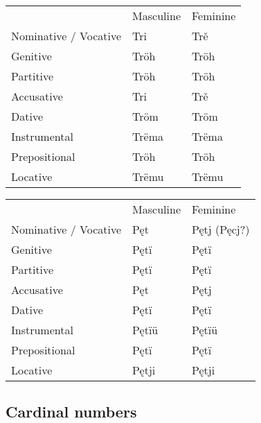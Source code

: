 \begin{table}
	\begin{tabular}{lll}
		& Masculine & Feminine \\
		Nominative / Vocative & Tri & Trě \\
		Genitive & Tröh & Tröh \\
		Partitive & Tröh & Tröh \\
		Accusative & Tri & Trě \\
		Dative & Tröm & Tröm \\
		Instrumental & Trëma & Trëma \\
		Prepositional & Tröh & Tröh \\
		Locative & Trëmu & Trëmu \\
	\end{tabular}
\end{table}

\begin{table}
	\begin{tabular}{lll}
		& Masculine & Feminine \\
		Nominative / Vocative & Pęt & Pętj (Pęcj?) \\
		Genitive & Pętï & Pętï \\
		Partitive & Pętï & Pętï \\
		Accusative & Pęt & Pętj \\
		Dative & Pętï & Pętï \\
		Instrumental & Pętïü & Pętïü \\
		Prepositional & Pętï & Pętï \\
		Locative & Pętji & Pętji \\
	\end{tabular}
\end{table}


\subsection{Cardinal numbers}

